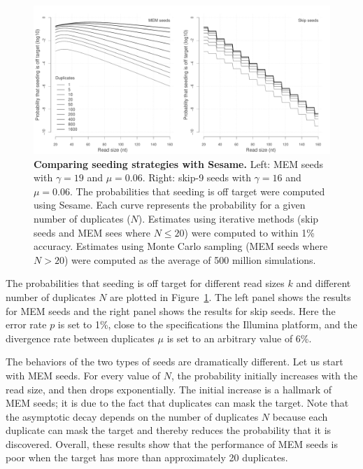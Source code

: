 \documentclass{article}
\begin{document}
\begin{figure}[t]
\begin{center}
\includegraphics[scale=.41]{mortal_kombat.pdf}
\end{center}
\caption{\textbf{Comparing seeding strategies with Sesame.} Left: MEM
seeds with $\gamma=19$ and $\mu=0.06$. Right: skip-9 seeds with
$\gamma=16$ and $\mu=0.06$. The probabilities that seeding is off target
were computed using Sesame. Each curve represents the probability for a
given number of duplicates ($N$). Estimates using iterative methods (skip
seeds and MEM sees where $N \leq 20$) were computed to within 1\%
accuracy. Estimates using Monte Carlo sampling (MEM seeds where $N > 20$)
were computed as the average of 500 million simulations.
}
\label{fig_mortal_kombat}
\end{figure}

The probabilities that seeding is off target for different read sizes $k$
and different number of duplicates $N$ are plotted in
Figure~\ref{fig_mortal_kombat}. The left panel shows the results for MEM
seeds and the right panel shows the results for skip seeds. Here the error
rate $p$ is set to 1\%, close to the specifications the Illumina platform,
and the divergence rate between duplicates $\mu$ is set to an arbitrary
value of 6\%.

The behaviors of the two types of seeds are dramatically different. Let us
start with MEM seeds. For every value of $N$, the probability initially
increases with the read size, and then drops exponentially. The initial
increase is a hallmark of MEM seeds; it is due to the fact that duplicates
can mask the target. Note that the asymptotic decay depends on the number
of duplicates $N$ because each duplicate can mask the target and thereby
reduces the probability that it is discovered. Overall, these results show
that the performance of MEM seeds is poor when the target has more than
approximately 20 duplicates.
\end{document}
